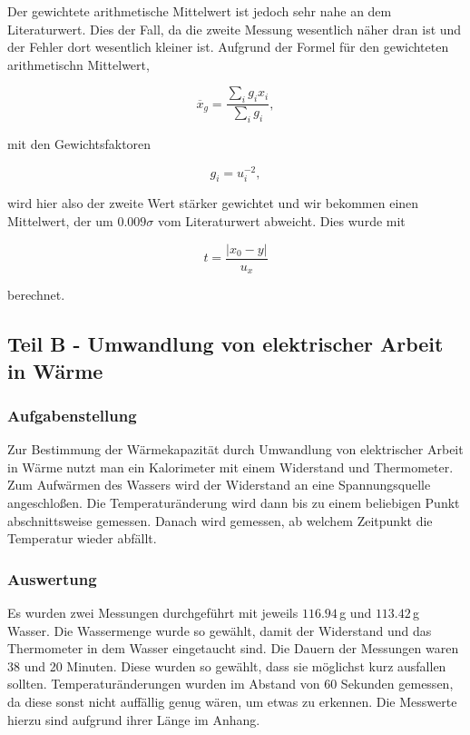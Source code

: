 \documentclass[11pt,a4paper]{article}
\begin{document}
Der gewichtete arithmetische Mittelwert ist jedoch sehr nahe an dem Literaturwert. Dies der Fall, da die zweite Messung wesentlich n\"aher dran ist und der Fehler dort wesentlich kleiner ist. Aufgrund der Formel f\"ur den gewichteten arithmetischn Mittelwert,

\begin{equation}
\overline{x}_g=\frac{\sum_ig_ix_i}{\sum_ig_i},
\end{equation}

mit den Gewichtsfaktoren

\begin{equation}
g_i=u_i^{-2},
\end{equation}

wird hier also der zweite Wert st\"arker gewichtet und wir bekommen einen Mittelwert, der um $0.009\sigma$ vom Literaturwert abweicht. Dies wurde mit 

\begin{equation}
t=\frac{|x_0-y|}{u_x}
\end{equation}

berechnet.

\pagebreak

\subsection{Teil B - Umwandlung von elektrischer Arbeit in Wärme}

\subsubsection{Aufgabenstellung}

Zur Bestimmung der W\"armekapazit\"at durch Umwandlung von elektrischer Arbeit in W\"arme nutzt man ein Kalorimeter mit einem Widerstand und Thermometer. Zum Aufw\"armen des Wassers wird der Widerstand an eine Spannungsquelle angeschlo\ss en. Die Temperatur\"anderung wird dann bis zu einem beliebigen Punkt abschnittsweise gemessen. Danach wird gemessen, ab welchem Zeitpunkt die Temperatur wieder abf\"allt.

\subsubsection{Auswertung}

Es wurden zwei Messungen durchgef\"uhrt mit jeweils $116.94\,$g und $113.42\,$g Wasser. Die Wassermenge wurde so gew\"ahlt, damit der Widerstand und das Thermometer in dem Wasser eingetaucht sind. Die Dauern der Messungen waren 38 und 20 Minuten. Diese wurden so gew\"ahlt, dass sie m\"oglichst kurz ausfallen sollten. Temperatur\"anderungen wurden im Abstand von 60 Sekunden gemessen, da diese sonst nicht auff\"allig genug w\"aren, um etwas zu erkennen. Die Messwerte hierzu sind aufgrund ihrer L\"ange im Anhang.
\end{document}
